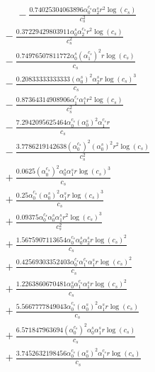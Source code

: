 \documentclass[10pt]{article}
\begin{document}
\begin{align*}
\phantom{R_{2,6}} &\phantom{={}}{}  - \frac{0.74025304063896 \alpha_{0}^{c_s} \alpha_{2}^s r^{2} \log{\left(c_{s} \right)}}{c_{s}^{2}} \\
&{}  - \frac{0.37229429803911 \alpha_{0}^s \alpha_{2}^{c_s} r^{2} \log{\left(c_{s} \right)}}{c_{s}^{2}} \\
&{}  - \frac{0.74976507811772 \alpha_{0}^s \left(\alpha_{1}^{c_s}\right)^{2} r \log{\left(c_{s} \right)}}{c_{s}} \\
&{}  - \frac{0.20833333333333 \left(\alpha_{0}^s\right)^{2} \alpha_{2}^s r \log{\left(c_{s} \right)}^{3}}{c_{s}} \\
&{}  - \frac{0.87364314908906 \alpha_{1}^{c_s} \alpha_{1}^s r^{2} \log{\left(c_{s} \right)}}{c_{s}^{2}} \\
&{}  - \frac{7.2942095625464 \alpha_{0}^{c_s} \left(\alpha_{0}^s\right)^{2} \alpha_{1}^{c_s} r}{c_{s}} \\
&{}  - \frac{3.7786219142638 \left(\alpha_{0}^{c_s}\right)^{2} \left(\alpha_{0}^s\right)^{2} r^{2} \log{\left(c_{s} \right)}}{c_{s}^{2}} \\
&{}  + \frac{0.0625 \left(\alpha_{0}^{c_s}\right)^{2} \alpha_{0}^s \alpha_{1}^s r \log{\left(c_{s} \right)}^{3}}{c_{s}} \\
&{}  + \frac{0.25 \alpha_{0}^{c_s} \left(\alpha_{0}^s\right)^{2} \alpha_{1}^s r \log{\left(c_{s} \right)}^{3}}{c_{s}} \\
&{}  + \frac{0.09375 \alpha_{0}^{c_s} \alpha_{0}^s \alpha_{1}^s r^{2} \log{\left(c_{s} \right)}^{3}}{c_{s}^{2}} \\
&{}  + \frac{1.5675907113654 \alpha_{0}^{c_s} \alpha_{0}^s \alpha_{2}^s r \log{\left(c_{s} \right)}^{2}}{c_{s}} \\
&{}  + \frac{0.42569303352403 \alpha_{0}^{c_s} \alpha_{1}^{c_s} \alpha_{1}^s r \log{\left(c_{s} \right)}^{2}}{c_{s}} \\
&{}  + \frac{1.2263860670481 \alpha_{0}^s \alpha_{1}^{c_s} \alpha_{1}^s r \log{\left(c_{s} \right)}^{2}}{c_{s}} \\
&{}  + \frac{5.5667777849043 \alpha_{0}^{c_s} \left(\alpha_{0}^s\right)^{2} \alpha_{1}^s r \log{\left(c_{s} \right)}}{c_{s}} \\
&{}  + \frac{6.571847963694 \left(\alpha_{0}^{c_s}\right)^{2} \alpha_{0}^s \alpha_{1}^s r \log{\left(c_{s} \right)}}{c_{s}} \\
&{}  + \frac{3.7452632198456 \alpha_{0}^{c_s} \left(\alpha_{0}^s\right)^{2} \alpha_{1}^{c_s} r \log{\left(c_{s} \right)}}{c_{s}} \\

\end{align*}
\end{document}
